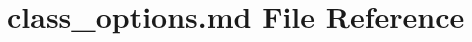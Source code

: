 \hypertarget{class__options_8md}{}\section{class\+\_\+options.\+md File Reference}
\label{class__options_8md}
